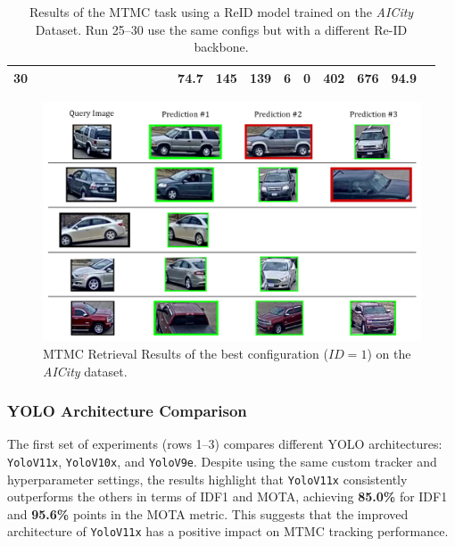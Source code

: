 \begin{table}
{\begin{tabular}{|c|c|c|c|c|c|c|c|c|c|c|c|c|c|c|c|c|c|c|c|c|}
            30 & & & & & & & & & & & & 74.7 & 145 & 139 & 6 & 0 & 402 & 676 & 94.9 \\ %
            \hline
        \end{tabular}
    } %
    \vspace{0.5cm}
    \caption[MTMC Results]{Results of the MTMC task using a ReID model trained on the \textit{AICity} Dataset. Run 25--30 use the same configs but with a different Re-ID backbone.}
    \label{tab:MTMCPerformance}
\end{table}

\begin{center}
    \begin{figure}[H]
        \includegraphics[width=1.00\textwidth]{Images/MTMCRetrieval.png}
        \caption[MTMC Retrieval Results]{MTMC Retrieval Results of the best configuration ($ID = 1$) on the \textit{AICity} dataset.}
        \label{fig:MTMCRetrieval}
    \end{figure}
\end{center}

\subsubsection{YOLO Architecture Comparison}
The first set of experiments (rows 1--3) compares different YOLO architectures: \texttt{YoloV11x}, \texttt{YoloV10x}, and \texttt{YoloV9e}. Despite using the same custom tracker and hyperparameter settings, the results highlight that \texttt{YoloV11x} consistently outperforms the others in terms of IDF1 and MOTA, achieving \textbf{85.0\%} for IDF1 and \textbf{95.6\%} points in the MOTA metric. This suggests that the improved architecture of \texttt{YoloV11x} has a positive impact on MTMC tracking performance.

